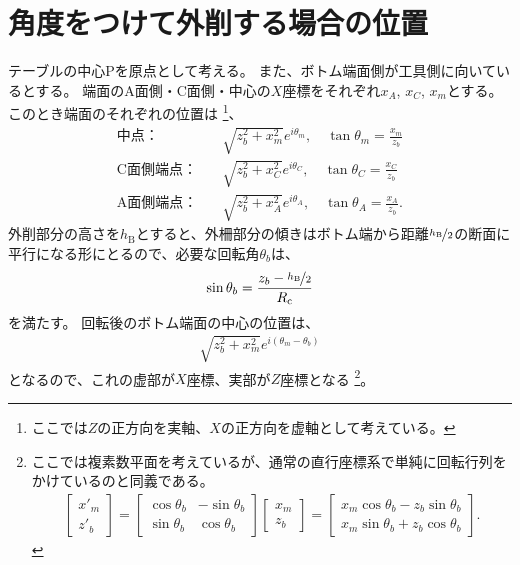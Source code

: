 \section{角度をつけて外削する場合の位置}
テーブルの中心Pを原点として考える。
また、ボトム端面側が工具側に向いているとする。
端面のA面側・C面側・中心の$X$座標をそれぞれ$x_A$, $x_C$, $x_m$とする。
このとき端面のそれぞれの位置は
\footnote{ここでは$Z$の正方向を実軸、$X$の正方向を虚軸として考えている。}、
\begin{subequations}
\begin{align*}
  \text{中点：}&\quad \sqrt{z_b^2+x_m^2}e^{i\theta_m}, \quad \tan\theta_m = \frac{x_m}{z_b}\\
  \text{C面側端点：}&\quad \sqrt{z_b^2+x_C^2}e^{i\theta_C}, \quad \tan\theta_C = \frac{x_C}{z_b}\\
  \text{A面側端点：}&\quad \sqrt{z_b^2+x_A^2}e^{i\theta_A}, \quad \tan\theta_A = \frac{x_A}{z_b}.
\end{align*}
\end{subequations}
外削部分の高さを$h_\mathrm B$とすると、外柵部分の傾きはボトム端から距離$\nicefrac{h_\mathrm B}2$の断面に平行になる形にとるので、必要な回転角$\theta_b$は、
\begin{align*}
  \sin\theta_b = \frac{z_b-\nicefrac{h_\mathrm B}2}{R_\mathrm c}
\end{align*}
を満たす。
回転後のボトム端面の中心の位置は、
\begin{align*}
  \sqrt{z_b^2+x_m^2}e^{i(\theta_m-\theta_b)}
\end{align*}
となるので、これの虚部が$X$座標、実部が$Z$座標となる
\footnote{ここでは複素数平面を考えているが、通常の直行座標系で単純に回転行列をかけているのと同義である。
\begin{align*}
  \left[
    \begin{array}{c}
      x'_m\\
      z'_b
    \end{array}
  \right]
  = \left[
    \begin{array}{cc}
      \cos\theta_b & -\sin\theta_b\\
      \sin\theta_b & \cos\theta_b
    \end{array}
  \right]\!\!
  \left[
    \begin{array}{c}
      x_m\\
      z_b
    \end{array}
  \right]
  = \left[
    \begin{array}{c}
      x_m\cos\theta_b-z_b\sin\theta_b\\
      x_m\sin\theta_b+z_b\cos\theta_b
    \end{array}
  \right].
\end{align*}}。
